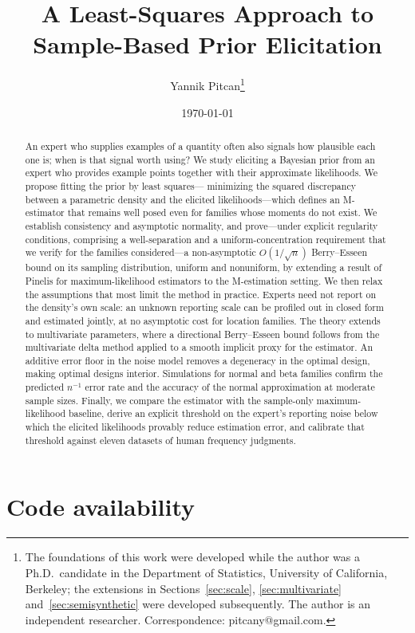 \documentclass[11pt]{article}
\title{A Least-Squares Approach to Sample-Based Prior Elicitation}
\author{Yannik Pitcan\thanks{The foundations of this work were developed while
the author was a Ph.D.\ candidate in the Department of Statistics, University
of California, Berkeley; the extensions in Sections~\ref{sec:scale},
\ref{sec:multivariate} and~\ref{sec:semisynthetic} were developed subsequently.
The author is an independent researcher. Correspondence: pitcany@gmail.com.}}
\date{\today}
\theoremstyle{remark}
\begin{document}
\maketitle

\begin{abstract}
An expert who supplies examples of a quantity often also signals how plausible
each one is; when is that signal worth using? We study eliciting
a Bayesian prior from an expert who provides example points together with their
approximate likelihoods. We propose fitting the prior by least squares---%
minimizing the squared discrepancy between a parametric density and the
elicited likelihoods---which defines an M-estimator that remains well posed even
for families whose moments do not exist. We establish
consistency and asymptotic normality,
and prove---under explicit regularity conditions, comprising a well-separation
and a uniform-concentration requirement that we verify for the families
considered---a non-asymptotic $O(1/\sqrt{n})$ Berry--Esseen bound on its
sampling distribution, uniform and nonuniform, by extending a result of
Pinelis for maximum-likelihood estimators to the M-estimation setting. We then
relax the assumptions that most limit the method in practice. Experts need not
report on the density's own scale: an unknown reporting scale can be profiled
out in closed form and estimated jointly, at no asymptotic cost for location
families. The theory extends to multivariate parameters, where a directional
Berry--Esseen bound follows from the multivariate delta method applied to a
smooth implicit proxy for the estimator. An additive error floor in the noise
model removes a degeneracy in the optimal design, making optimal designs
interior. Simulations for
normal and beta families confirm the predicted $n^{-1}$ error rate and the
accuracy of the normal approximation at moderate sample sizes. Finally, we
compare the estimator with the sample-only maximum-likelihood baseline,
derive an explicit threshold on the expert's reporting noise below which the
elicited likelihoods provably reduce estimation error, and calibrate that
threshold against eleven datasets of human frequency judgments.
\end{abstract}



\section*{Code availability}
\end{document}
